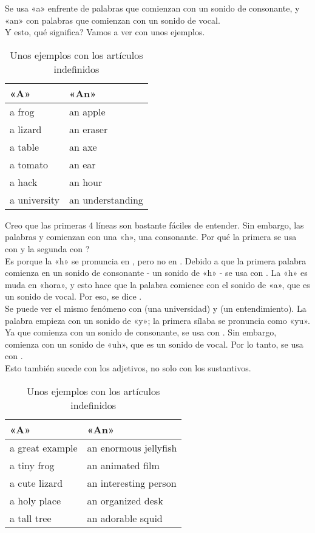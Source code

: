 Se usa «a» enfrente de palabras que comienzan con un sonido de consonante,
y «an» con palabras que comienzan con un sonido de vocal.\\

Y esto, \textquestiondown qu\'e significa? Vamos a ver con unos ejemplos.

\begin{table}[H]
	\centering
	\begin{tabular}{ll}
	\toprule
	\textbf{«A»} & \textbf{«An»} \\
	\midrule
	a frog & an apple \\
	a lizard & an eraser \\
	a table & an axe \\
	a tomato & an ear \\
	a hack & an hour \\
	a university & an understanding \\
	\bottomrule
	\end{tabular}
	\caption{Unos ejemplos con los art\'iculos indefinidos}
\end{table}

Creo que las primeras 4 l\'ineas son bastante f\'aciles de entender.
Sin embargo, las palabras  y  comienzan con una «h», una
consonante. \textquestiondown Por qu\'e la primera se usa con 
y la segunda con ? \\

Es porque la «h» se pronuncia en , pero no en .
Debido a que la primera palabra comienza en un sonido de consonante - un
sonido de «h» - se usa con . La «h» es muda en «hora», y esto
hace que la palabra comience con el sonido de «a», que es un sonido de vocal.
Por eso, se dice .\\

Se puede ver el mismo fen\'omeno con  (una universidad) y
 (un entendimiento). La palabra  empieza
con un sonido de «y»; la primera s\'ilaba se pronuncia como «yu». Ya que
comienza con un sonido de consonante, se usa con . Sin embargo,
 comienza con un sonido de «uh», que es un sonido de vocal.
Por lo tanto, se usa con .\\

Esto tambi\'en sucede con los adjetivos, no solo con los sustantivos.

\begin{table}[H]
	\centering
	\begin{tabular}{ll}
	\toprule
	\textbf{«A»} & \textbf{«An»} \\
	\midrule
	a great example & an enormous jellyfish \\
	a tiny frog & an animated film \\
	a cute lizard & an interesting person \\
	a holy place & an organized desk\\
	a tall tree & an adorable squid \\
	\bottomrule
	\end{tabular}
	\caption{Unos ejemplos con los art\'iculos indefinidos}
\end{table}

